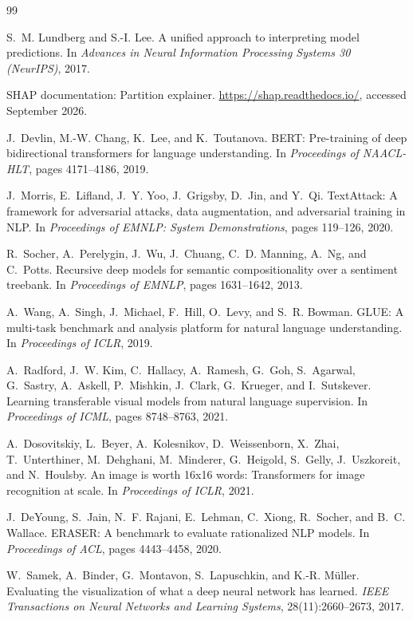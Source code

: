 \documentclass[11pt,a4paper]{article}
\begin{document}
\begin{thebibliography}{99}

S.~M. Lundberg and S.-I. Lee.
A unified approach to interpreting model predictions.
In \emph{Advances in Neural Information Processing Systems 30 (NeurIPS)}, 2017.

SHAP documentation: Partition explainer.
\url{https://shap.readthedocs.io/}, accessed September 2026.

J.~Devlin, M.-W. Chang, K.~Lee, and K.~Toutanova.
BERT: Pre-training of deep bidirectional transformers for language understanding.
In \emph{Proceedings of NAACL-HLT}, pages 4171--4186, 2019.

J.~Morris, E.~Lifland, J.~Y. Yoo, J.~Grigsby, D.~Jin, and Y.~Qi.
TextAttack: A framework for adversarial attacks, data augmentation, and adversarial
training in NLP.
In \emph{Proceedings of EMNLP: System Demonstrations}, pages 119--126, 2020.

R.~Socher, A.~Perelygin, J.~Wu, J.~Chuang, C.~D. Manning, A.~Ng, and C.~Potts.
Recursive deep models for semantic compositionality over a sentiment treebank.
In \emph{Proceedings of EMNLP}, pages 1631--1642, 2013.

A.~Wang, A.~Singh, J.~Michael, F.~Hill, O.~Levy, and S.~R. Bowman.
GLUE: A multi-task benchmark and analysis platform for natural language understanding.
In \emph{Proceedings of ICLR}, 2019.

A.~Radford, J.~W. Kim, C.~Hallacy, A.~Ramesh, G.~Goh, S.~Agarwal, G.~Sastry, A.~Askell,
P.~Mishkin, J.~Clark, G.~Krueger, and I.~Sutskever.
Learning transferable visual models from natural language supervision.
In \emph{Proceedings of ICML}, pages 8748--8763, 2021.

A.~Dosovitskiy, L.~Beyer, A.~Kolesnikov, D.~Weissenborn, X.~Zhai, T.~Unterthiner,
M.~Dehghani, M.~Minderer, G.~Heigold, S.~Gelly, J.~Uszkoreit, and N.~Houlsby.
An image is worth 16x16 words: Transformers for image recognition at scale.
In \emph{Proceedings of ICLR}, 2021.

J.~DeYoung, S.~Jain, N.~F. Rajani, E.~Lehman, C.~Xiong, R.~Socher, and B.~C. Wallace.
ERASER: A benchmark to evaluate rationalized NLP models.
In \emph{Proceedings of ACL}, pages 4443--4458, 2020.

W.~Samek, A.~Binder, G.~Montavon, S.~Lapuschkin, and K.-R. M\"uller.
Evaluating the visualization of what a deep neural network has learned.
\emph{IEEE Transactions on Neural Networks and Learning Systems}, 28(11):2660--2673, 2017.


\end{thebibliography}
\end{document}
